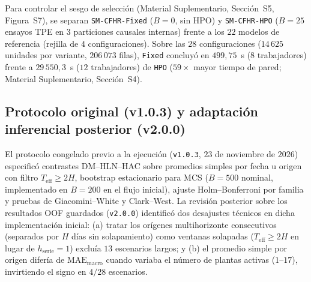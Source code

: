 Para controlar el sesgo de selección \cite{varma2006bias,cawley2010overfit} (Material Suplementario, Sección~S5, Figura~S7), se separan \texttt{SM-CFHR-Fixed} ($B=0$, sin HPO) y \texttt{SM-CFHR-HPO} ($B=25$ ensayos TPE en $3$ particiones causales internas) frente a los $22$ modelos de referencia (rejilla de $4$ configuraciones). Sobre las $28$ configuraciones ($14\,625$ unidades por variante, $206\,073$ filas), \texttt{Fixed} concluyó en $499{,}75$~s ($8$ trabajadores) frente a $29\,550{,}3$~s ($12$ trabajadores) de \texttt{HPO} ($59\times$ mayor tiempo de pared; Material Suplementario, Sección~S4).

\subsection{Protocolo original (v1.0.3) y adaptación inferencial posterior (v2.0.0)}

El protocolo congelado previo a la ejecución (\texttt{v1.0.3}, $23$ de noviembre de $2026$) especificó contrastes DM--HLN--HAC sobre promedios simples por fecha u origen con filtro $T_{\mathrm{eff}} \ge 2H$, bootstrap estacionario para MCS ($B=500$ nominal, implementado en $B=200$ en el flujo inicial), ajuste Holm--Bonferroni por familia y pruebas de Giacomini--White y Clark--West. La revisión posterior sobre los resultados OOF guardados (\texttt{v2.0.0}) identificó dos desajustes técnicos en dicha implementación inicial: (a) tratar los orígenes multihorizonte consecutivos (separados por $H$ días sin solapamiento) como ventanas solapadas ($T_{\mathrm{eff}} \ge 2H$ en lugar de $h_{\mathrm{serie}}=1$) excluía $13$ escenarios largos; y (b) el promedio simple por origen difería de $\mathrm{MAE}_{\mathrm{macro}}$ cuando variaba el número de plantas activas ($1$--$17$), invirtiendo el signo en $4/28$ escenarios.

